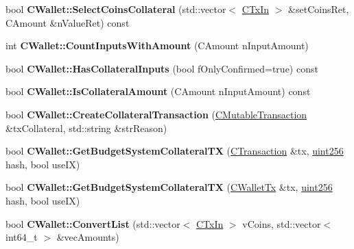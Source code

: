 \begin{DoxyCompactItemize}
bool {\bfseries C\+Wallet\+::\+Select\+Coins\+Collateral} (std\+::vector$<$ \mbox{\hyperlink{class_c_tx_in}{C\+Tx\+In}} $>$ \&set\+Coins\+Ret, C\+Amount \&n\+Value\+Ret) const
\item 
\mbox{\label{group___actions_ga6ab79abf1aba845254fe5969731ba2ad}} 
int {\bfseries C\+Wallet\+::\+Count\+Inputs\+With\+Amount} (C\+Amount n\+Input\+Amount)
\item 
\mbox{\label{group___actions_ga059d185bded45fcf230a7a75e1be5f0e}} 
bool {\bfseries C\+Wallet\+::\+Has\+Collateral\+Inputs} (bool f\+Only\+Confirmed=true) const
\item 
\mbox{\label{group___actions_gaea356cdf45e0ec83056ca5b0576add2b}} 
bool {\bfseries C\+Wallet\+::\+Is\+Collateral\+Amount} (C\+Amount n\+Input\+Amount) const
\item 
\mbox{\label{group___actions_ga94971f63a4a5ed96e2c5c6760a29bfa6}} 
bool {\bfseries C\+Wallet\+::\+Create\+Collateral\+Transaction} (\mbox{\hyperlink{struct_c_mutable_transaction}{C\+Mutable\+Transaction}} \&tx\+Collateral, std\+::string \&str\+Reason)
\item 
\mbox{\label{group___actions_ga7e5345f36180c9133bbbac9b1e2c9fb6}} 
bool {\bfseries C\+Wallet\+::\+Get\+Budget\+System\+Collateral\+TX} (\mbox{\hyperlink{class_c_transaction}{C\+Transaction}} \&tx, \mbox{\hyperlink{classuint256}{uint256}} hash, bool use\+IX)
\item 
\mbox{\label{group___actions_gade832913e51777e2b25255d54ef3e583}} 
bool {\bfseries C\+Wallet\+::\+Get\+Budget\+System\+Collateral\+TX} (\mbox{\hyperlink{class_c_wallet_tx}{C\+Wallet\+Tx}} \&tx, \mbox{\hyperlink{classuint256}{uint256}} hash, bool use\+IX)
\item 
\mbox{\label{group___actions_gadbc8cbc5a39e04446f4277487405c06b}} 
bool {\bfseries C\+Wallet\+::\+Convert\+List} (std\+::vector$<$ \mbox{\hyperlink{class_c_tx_in}{C\+Tx\+In}} $>$ v\+Coins, std\+::vector$<$ int64\+\_\+t $>$ \&vec\+Amounts)
\item 
\mbox{\label{group___actions_gab3e915da03d5e3b0d38d2a2289ee198f}} 

\end{DoxyCompactItemize}
